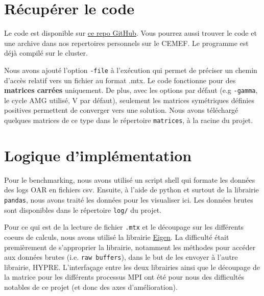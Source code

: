 \documentclass[10pt,twocolumn,letterpaper]{article}
\def\code#1{\texttt{#1}}
\begin{document}
\section{Récupérer le code}
Le code est disponible sur
\href{https://github.com/Aympab/HypreBoomerAMG_Benchmark}{ce repo GitHub}.
Vous pourrez aussi trouver le code et une archive dans nos repertoires
personnels sur le CEMEF. Le programme est déjà compilé sur le cluster.

Nous avons ajouté l'option \code{-file} à l'exécution qui permet de préciser
un chemin d'accès relatif vers un fichier au format .mtx. Le code fonctionne
pour des \textbf{matrices carrées} uniquement. De plus, avec les options par
défaut (e.g \code{-gamma}, le cycle AMG utilisé, V par défaut), seulement les
matrices symétriques définies positives permettent de converger vers une
solution. Nous avons téléchargé quelques matrices de ce type dans le répertoire
\code{matrices}, à la racine du projet.

\section{Logique d'implémentation}

Pour le benchmarking, nous avons utilisé un script shell qui formate les données
des logs OAR en fichiers csv.
Ensuite, à l'aide de python et surtout de la librairie \code{pandas}, nous avons
traité les données pour les visualiser ici.
Les données brutes sont disponibles dans le répertoire \code{log/} du projet.

Pour ce qui est de la lecture de fichier \code{.mtx} et le découpage sur les
différents coeurs de calculs, nous avons utilisé la librairie
\href{https://eigen.tuxfamily.org/index.php?title=Main_Page}{Eigen}.
La difficulté était premièrement de s'approprier la librairie, notamment les
méthodes pour accéder aux données brutes (i.e. \code{raw buffers}), dans le but
de les envoyer à l'autre librairie, HYPRE. L'interfaçage entre les deux
librairies ainsi que le découpage de la matrice pour les différents processus
MPI ont été pour nous des difficultés notables de ce projet (et donc des axes
d'amélioration).
\end{document}
